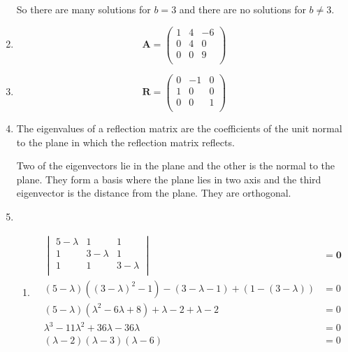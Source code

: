 \documentclass[10pt,oneside,a4paper]{article}
\begin{document}
\begin{enumerate}
So there are many solutions for $b = 3$ and there are no solutions for $b \neq 3$.

\item 

\[
\mathbf{A} =
\begin{pmatrix}
1 & 4 & -6 \\
0 & 4 & 0 \\
0 & 0 & 9 \\
\end{pmatrix}
\]

\item

\[
\mathbf{R} =
\begin{pmatrix}
0 & -1 & 0 \\
1 & 0 &  0 \\
0 & 0 & 1 \\
\end{pmatrix}
\]

\item

The eigenvalues of a reflection matrix are the coefficients of the unit normal to the plane in which the reflection
matrix reflects.

Two of the eigenvectors lie in the plane and the other is the normal to the plane. They form a basis where the plane
lies in two axis and the third eigenvector is the distance from the plane.
They are orthogonal.

\item

\begin{enumerate}[label=(\roman*)]

\item

\[
\begin{split}
\begin{vmatrix}
5 - \lambda & 1 & 1 \\
1 & 3 - \lambda & 1 \\
1 & 1 & 3 - \lambda \\
\end{vmatrix}
&= \mathbf{0} \\
(5 - \lambda)((3 - \lambda)^2 - 1) - (3 - \lambda - 1) + (1 - (3 - \lambda)) &= 0 \\
(5 - \lambda)(\lambda^2 - 6\lambda + 8) + \lambda - 2 + \lambda - 2 &= 0 \\
\lambda^3 - 11\lambda^2 + 36\lambda - 36\lambda &= 0 \\
(\lambda - 2)(\lambda - 3)(\lambda - 6) &= 0 \\
\end{split}
\]


\end{enumerate}
\end{enumerate}
\end{document}
